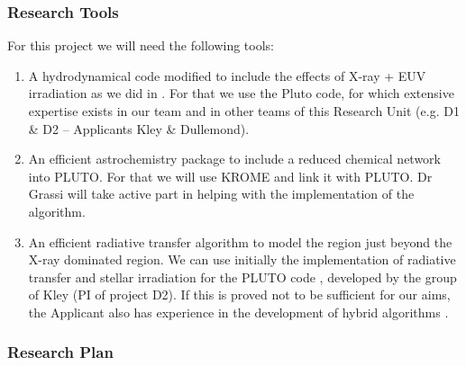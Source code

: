 \documentclass[10pt,fleqn,twoside]{article}
\begin{document}
\subsubsection{Research Tools}

For this project we will need the following tools: 
\begin{enumerate}
\item A hydrodynamical code modified to include the
  effects of X-ray + EUV irradiation as we did in 
  \citet{2010MNRAS.401.1415O}.
  For
  that we use the Pluto code, for which extensive expertise
  exists in our team and in other teams of this Research Unit (e.g. D1
  \& D2 -- Applicants Kley \& Dullemond).
\item An efficient astrochemistry package to include a reduced
  chemical network into PLUTO. For that we will use KROME 
  \citep{2014MNRAS.439.2386G}  
and link it with PLUTO. Dr Grassi will take active part in helping
with the implementation of the algorithm.
\item An efficient radiative transfer algorithm to model the region
  just beyond the X-ray dominated region. We can use initially the
  implementation of radiative transfer and stellar irradiation
for the PLUTO code 
\citep{2013A&A...559A..80K},
developed by the group of Kley
(PI of project D2). If this is proved not to be sufficient for our
aims, the Applicant also has experience in the
development of hybrid algorithms  
\citep{2014ASSP...36..127O}.

\end{enumerate}

\subsubsection{Research Plan} 
\end{document}
